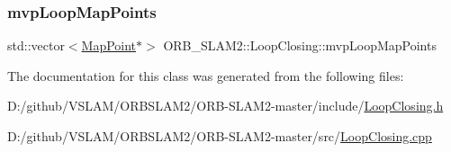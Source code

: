 \subsubsection{\texorpdfstring{mvp\+Loop\+Map\+Points}{mvpLoopMapPoints}}
{\footnotesize\ttfamily std\+::vector$<$\mbox{\hyperlink{class_o_r_b___s_l_a_m2_1_1_map_point}{Map\+Point}}$\ast$$>$ O\+R\+B\+\_\+\+S\+L\+A\+M2\+::\+Loop\+Closing\+::mvp\+Loop\+Map\+Points\hspace{0.3cm}{\ttfamily [protected]}}



The documentation for this class was generated from the following files\+:\begin{DoxyCompactItemize}
\item 
D\+:/github/\+V\+S\+L\+A\+M/\+O\+R\+B\+S\+L\+A\+M2/\+O\+R\+B-\/\+S\+L\+A\+M2-\/master/include/\mbox{\hyperlink{_loop_closing_8h}{Loop\+Closing.\+h}}\item 
D\+:/github/\+V\+S\+L\+A\+M/\+O\+R\+B\+S\+L\+A\+M2/\+O\+R\+B-\/\+S\+L\+A\+M2-\/master/src/\mbox{\hyperlink{_loop_closing_8cpp}{Loop\+Closing.\+cpp}}\end{DoxyCompactItemize}
